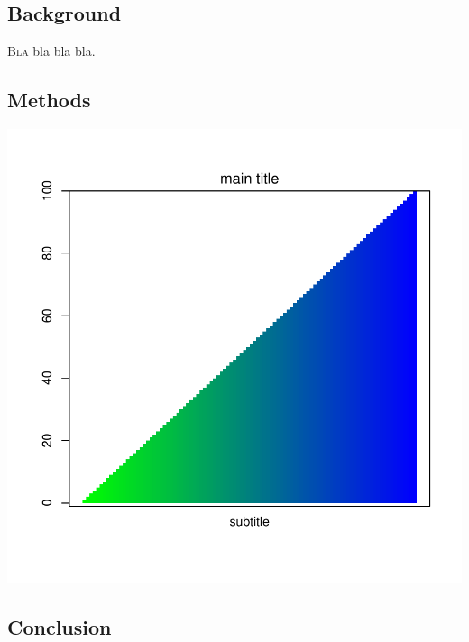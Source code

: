 \documentclass[11pt]{article}
\begin{document}
\begin{multicols}{2} 

\subsection*{Background}

\lettrine[nindent=0em,lines=3]{B}{la} bla bla bla.\cite{Cottler2014} \blindtext 

\subsection*{Methods}
\blindtext

\begin{center}
\includegraphics{chik_analyse_pour_madsen-002}
\end{center}

\subsection*{Conclusion}
\blindtext





\end{multicols}
\newpage


\end{document}
